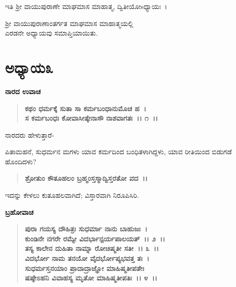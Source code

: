\begin{center}
ಇತಿ ಶ‍್ರೀ ವಾಯುಪುರಾಣೇ ಮಾಘಮಾಸ ಮಾಹಾತ್ಮ, ದ್ವಿತೀಯೋsಧ್ಯಾಯಃ~।
\end{center}

\begin{center}
ಶ‍್ರೀ ವಾಯುಪುರಾಣಾಂತರ್ಗತ ಮಾಘಮಾಸ ಮಾಹಾತ್ಮಯಲ್ಲಿ \\ ಎರಡನೇ ಅಧ್ಯಾಯವು ಸಮಾಪ್ತಿಯಾಯಿತು.
\end{center}

\newpage

\section*{ಅಧ್ಯಾಯ\enginline{-}೩}

\emptypage

\begin{flushleft}
\textbf{ನಾರದ ಉವಾಚ\enginline{-}}
\end{flushleft}

\begin{verse}
\textbf{ಕಥಂ ಧರ್ಮಕ್ಕೆ ಸುತಾ ಸಾ ಕರ್ಮಬಂಧಾನುಮೊಚ ಹ~।}\\\textbf{ಸ ಕರ್ಮಬಂಧಃ ಕೋವಾಸೀತ್ಕೇನಾಸೌ ನಾಶವಾಗತಃ~।। ೧~।।}
\end{verse}

\begin{flushleft}
ನಾರದರು ಹೇಳುತ್ತಾರೆ-
\end{flushleft}

ಪಿತಾಮಹನೆ, ಸುಧರ್ಮನ ಮಗಳು ಯಾವ ಕರ್ಮದಿಂದ ಬಂಧಿತಳಾಗಿದ್ದಳು, ಯಾವ ರೀತಿಯಿಂದ ಬಿಡುಗಡೆ ಹೊಂದಿದಳು?

\begin{verse}
\textbf{ಶ್ರೋತುಂ ಕೌತೂಹಲಂ ಬ್ರಹ್ಮಂಸ್ತಸ್ಮಾದ್ವಿಸ್ತರತೋ ವದ~।।}
\end{verse}

ಇದನ್ನು ಕೇಳಲು ಕುತೂಹಲವಾಗಿದೆ; ವಿಸ್ತಾರವಾಗಿ ನಿರೂಪಿಸಿರಿ.

\begin{flushleft}
\textbf{ಬ್ರಹೋವಾಚ\enginline{-}}
\end{flushleft}

\begin{verse}
\textbf{ಪುರಾ ಗಯಸ್ಯ ದೌಹಿತ್ರಃ ಸುಧರ್ಮಾ ನಾನು ಬಾಹುಜಃ~।}\\\textbf{ಕುಂಡಿನೇ ನಗರೇ ರಮ್ಯೇ ವಿದರ್ಭಾನ್ಪರ್ಯಪಾಲಯತ್~।। ೨~।। }\\\textbf{ತಸ್ಯ ಕಾಲೇನ ದುಹಿತಾ ನಾಮ್ನಾ ರೋಚಿಷ್ಮತೀ ಸತೀ~।। ೩~।।} \\\textbf{ವಿದರ್ಭೋ ನಾಮ ತನಯೋ ವೈದರ್ಭೋಪ್ಯಭವತ್ತ ತಃ~।} \\\textbf{ಸುಧರ್ಮಸ್ತನಯಾಂ ಪ್ರಾದಾದ್ರಾಜ್ಞೋ ಮಾಹಿಷ್ಮತೀಪತೇಃ} \\\textbf{ಷಷ್ಠೇಽಹನಿ ವಿವಾಹಸ್ಯ ಮೃತೋ ಮಾಹಿಷ್ಮತೀಪತಿಃ~।। ೪~।।}
\end{verse}


